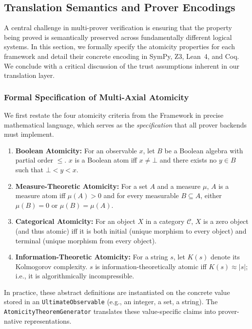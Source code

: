 \subsection{Translation Semantics and Prover Encodings}

A central challenge in multi-prover verification is ensuring that the property being proved is semantically preserved across fundamentally different logical systems. In this section, we formally specify the atomicity properties for each framework and detail their concrete encoding in SymPy, Z3, Lean~4, and Coq. We conclude with a critical discussion of the trust assumptions inherent in our translation layer.

\subsubsection{Formal Specification of Multi-Axial Atomicity}

We first restate the four atomicity criteria from the \Apeiron{} Framework in precise mathematical language, which serves as the \textit{specification} that all prover backends must implement.

\begin{enumerate}[label=(\roman*), leftmargin=*]
    \item \textbf{Boolean Atomicity:} For an observable $x$, let $B$ be a Boolean algebra with partial order $\leq$. $x$ is a Boolean atom iff $x \neq \bot$ and there exists no $y \in B$ such that $\bot < y < x$.
    \item \textbf{Measure-Theoretic Atomicity:} For a set $A$ and a measure $\mu$, $A$ is a measure atom iff $\mu(A) > 0$ and for every measurable $B \subseteq A$, either $\mu(B) = 0$ or $\mu(B) = \mu(A)$.
    \item \textbf{Categorical Atomicity:} For an object $X$ in a category $\mathcal{C}$, $X$ is a zero object (and thus atomic) iff it is both initial (unique morphism to every object) and terminal (unique morphism from every object).
    \item \textbf{Information-Theoretic Atomicity:} For a string $s$, let $K(s)$ denote its Kolmogorov complexity. $s$ is information-theoretically atomic iff $K(s) \approx |s|$; i.e., it is algorithmically incompressible.
\end{enumerate}

In practice, these abstract definitions are instantiated on the concrete value stored in an \texttt{UltimateObservable} (e.g., an integer, a set, a string). The \texttt{AtomicityTheoremGenerator} translates these value-specific claims into prover-native representations.


